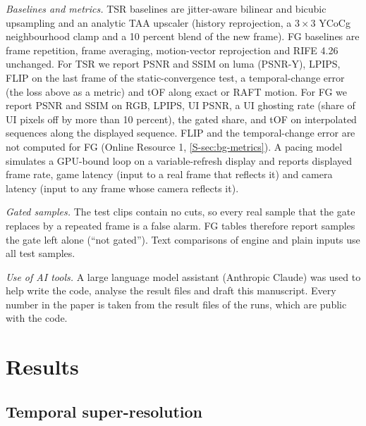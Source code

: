 \documentclass[pdflatex,sn-mathphys-num,iicol]{sn-jnl}
\begin{document}
\emph{Baselines and metrics.} TSR baselines are jitter-aware bilinear and bicubic upsampling and an analytic TAA upscaler (history reprojection, a $3\times3$ YCoCg neighbourhood clamp and a 10 percent blend of the new frame). FG baselines are frame repetition, frame averaging, motion-vector reprojection and RIFE 4.26 unchanged. For TSR we report PSNR and SSIM \cite{wang2004ssim} on luma (PSNR-Y), LPIPS, FLIP \cite{andersson2020flip} on the last frame of the static-convergence test, a temporal-change error (the loss above as a metric) and tOF \cite{chu2020tecogan} along exact or RAFT motion. For FG we report PSNR and SSIM on RGB, LPIPS, UI PSNR, a UI ghosting rate (share of UI pixels off by more than 10 percent), the gated share, and tOF on interpolated sequences along the displayed sequence. FLIP and the temporal-change error are not computed for FG (Online Resource 1, \cref{S-sec:bg-metrics}). A pacing model simulates a GPU-bound loop on a variable-refresh display and reports displayed frame rate, game latency (input to a real frame that reflects it) and camera latency (input to any frame whose camera reflects it).

\emph{Gated samples.} The test clips contain no cuts, so every real sample that the gate replaces by a repeated frame is a false alarm. FG tables therefore report samples the gate left alone (``not gated''). Text comparisons of engine and plain inputs use all test samples.

\emph{Use of AI tools.} A large language model assistant (Anthropic Claude) was used to help write the code, analyse the result files and draft this manuscript. Every number in the paper is taken from the result files of the runs, which are public with the code.

\section{Results}\label{sec:results}

\subsection{Temporal super-resolution}\label{sec:res-tsr}
\end{document}
